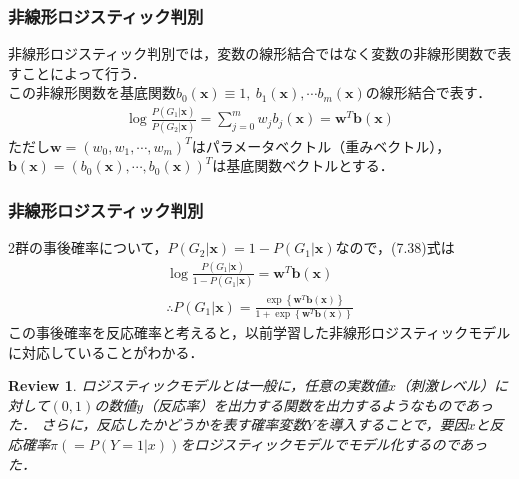 \documentclass[dvipdfmx,cjk]{beamer}
\theoremstyle{example}
\newtheorem{review}[thm]{Review}
\begin{document}
\begin{frame}
    \frametitle{非線形ロジスティック判別}
    非線形ロジスティック判別では，変数の線形結合ではなく変数の非線形関数で表すことによって行う．\\
    この非線形関数を基底関数$b_0(\boldsymbol{x})\equiv 1,\ b_1(\boldsymbol{x}),\cdots b_m(\boldsymbol{x})$の線形結合で表す．
    \begin{align*}
        \log \frac{P(G_1|\boldsymbol{x})}{P(G_2|\boldsymbol{x})}=\sum_{j=0}^{m}w_jb_j(\boldsymbol{x})=\boldsymbol{w}^T\boldsymbol{b}(\boldsymbol{x})\tag{7.38}
    \end{align*}
    ただし$\boldsymbol{w}=(w_0,w_1,\cdots, w_m)^T$はパラメータベクトル（重みベクトル），
    $\boldsymbol{b}(\boldsymbol{x})=(b_0(\boldsymbol{x}),\cdots,b_0(\boldsymbol{x}))^T$は基底関数ベクトルとする．
\end{frame}

\begin{frame}
    \frametitle{非線形ロジスティック判別}
    2群の事後確率について，$P(G_2|\boldsymbol{x})=1-P(G_1|\boldsymbol{x})$なので，(7.38)式は
    \begin{align*}
        \log\frac{P(G_1|\boldsymbol{x})}{1-P(G_1|\boldsymbol{x})}=\boldsymbol{w}^T\boldsymbol{b}(\boldsymbol{x}) \\
        \therefore P(G_1|\boldsymbol{x})=\frac{\exp\left\{\boldsymbol{w}^T\boldsymbol{b}(\boldsymbol{x})\right\}}{1+\exp \left\{\boldsymbol{w}^T\boldsymbol{b}(\boldsymbol{x})\right\}}
    \end{align*}
    この事後確率を反応確率と考えると，以前学習した非線形ロジスティックモデルに対応していることがわかる．\\

    \begin{review}
        ロジスティックモデルとは一般に，任意の実数値$x$（刺激レベル）に対して$(0,1)$の数値$y$（反応率）を出力する関数を出力するようなものであった．
        さらに，反応したかどうかを表す確率変数$Y$を導入することで，要因$x$と反応確率$\pi(=P(Y=1|x))$をロジスティックモデルでモデル化するのであった．
    \end{review}
\end{frame}
\end{document}
